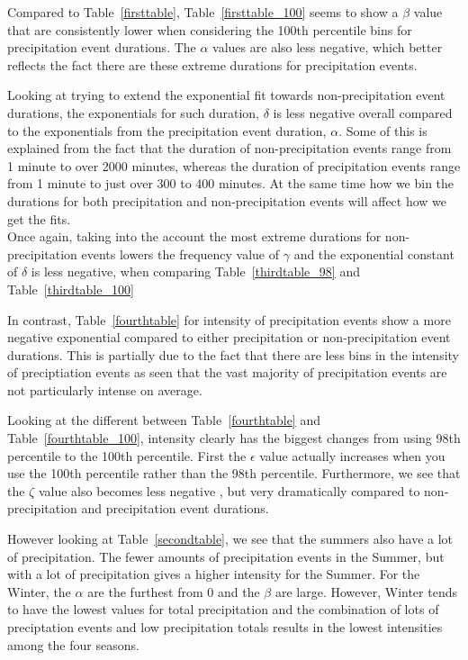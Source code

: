 \documentclass[11pt]{report}
\begin{document}
Compared to Table~\ref{firsttable}, Table~\ref{firsttable_100} seems to show a $\beta$ value that are consistently lower when considering the 100th percentile bins for precipitation event durations. The $\alpha$ values are also less negative, which better reflects the fact there are these extreme durations for precipitation events. 
 


Looking at trying to extend the exponential fit towards non-precipitation
event durations, the exponentials for such duration, $\delta$ is less
negative overall compared to the exponentials from the precipitation event
duration, $\alpha$. Some of this is explained from the fact that the
duration of non-precipitation events range from 1 minute to over 2000
minutes, whereas the duration of precipitation events range from 1 minute to
just over 300 to 400 minutes. At the same time how we bin the durations for both
precipitation and non-precipitation events will affect how we get the fits.
\\ 

Once again, taking into the account the most extreme durations for non-precipitation events lowers the frequency value of $\gamma$ and the exponential constant of $\delta$ is less negative, when comparing Table~\ref{thirdtable_98} and Table~\ref{thirdtable_100}




In contrast, Table~\ref{fourthtable} for intensity of precipitation events
show a more negative exponential compared to either precipitation or
non-precipitation event durations. This is partially due to the fact that
there are less bins in the intensity of preciptiation events as seen that
the vast majority of precipitation events are not particularly intense on
average.

Looking at the different between Table~\ref{fourthtable}
and Table~\ref{fourthtable_100}, intensity clearly has the biggest changes from using 98th percentile to the 100th percentile. First the $\epsilon$ value actually increases when you use the 100th percentile rather than the 98th percentile. Furthermore, we see that the $\zeta$ value also becomes less negative , but very dramatically compared to non-precipitation and precipitation event durations. 


However looking at
Table~\ref{secondtable}, we see that the summers also have a lot of
precipitation. The fewer amounts of precipitation events in the
Summer, but with a lot of precipitation gives a higher intensity for
the Summer. For the Winter, the $\alpha$ are the furthest from 0 and
the $\beta$ are large. However, Winter tends to have the lowest values
for total precipitation and the combination of lots of preciptation
events and low precipitation totals results in the lowest intensities
among the four seasons.
 
\clearpage
\end{document}

